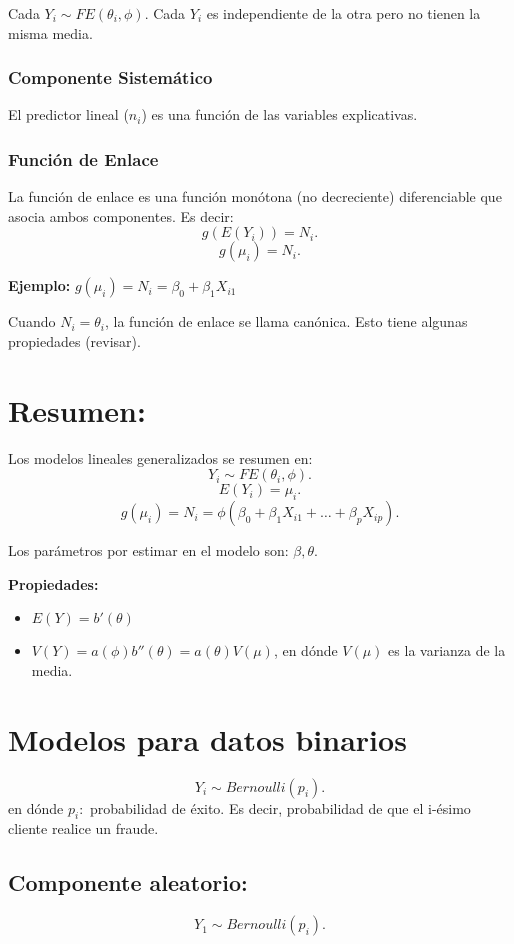 \documentclass{article}
\begin{document}
Cada $Y_{i}\sim FE{(\theta_{i},\phi)}$. Cada $Y_{i}$ es independiente de la otra pero no tienen la misma media.

\subsubsection{Componente Sistemático}
El predictor lineal ($n_{i}$) es una función de las variables explicativas.

\subsubsection{Función de Enlace}
La función de enlace es una función monótona (no decreciente) diferenciable que asocia ambos componentes. Es decir:
\[ g{(E{(Y_{i})})}=N_{i}.\]
\[ g{(\mu_{i})}=N_{i}.\]

\textbf{Ejemplo: } $g{(\mu_{i})}= N_{i} = \beta_{0}+\beta_{1}X_{i1}$

Cuando $N_{i}=\theta_{i}$, la función de enlace se llama canónica. Esto tiene algunas propiedades (revisar).

\section{Resumen:}
Los modelos lineales generalizados se resumen en:
\[ Y_{i} \sim FE{(\theta_{i},\phi)}.\]
\[ E{(Y_{i})}=\mu_{i}.\]
\[ g{(\mu_{i})}=N_{i}=\phi{(\beta_{0}+\beta_{1}X_{i1}+\ldots+\beta_{p}X_{ip})}.\]

Los parámetros por estimar en el modelo son: $\beta,\theta$.

\textbf{Propiedades: }
\begin{itemize}
	\item $E{(Y)}=b'{(\theta)}$
	\item $V{(Y)}=a{(\phi)}b''{(\theta)}=a{(\theta)}V{(\mu)}$, en dónde $V{(\mu)}$ es la varianza de la media.
\end{itemize}

\section{Modelos para datos binarios}
\[ Y_{i}\sim Bernoulli{(p_{i})}.\]
en dónde $p_{i}:$ probabilidad de éxito. Es decir, probabilidad de que el i-ésimo cliente realice un fraude.

\subsection{Componente aleatorio:}
\[ Y_{1}\sim Bernoulli{(p_{i})}.\]
\end{document}
